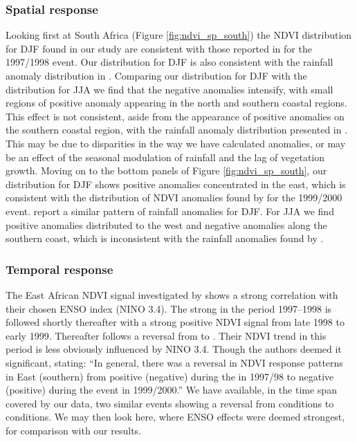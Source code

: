 \subsubsection{Spatial response}
Looking first at South Africa (Figure \ref{fig:ndvi_sp_south}) the
NDVI distribution for DJF \elnino{} found in our study are consistent
with those reported in \cite{anyamba2002} for the 1997/1998 \elnino{}
event. Our distribution for DJF \elnino{} is also consistent with the
rainfall anomaly distribution in \cite{deoliveira2018}. Comparing our
distribution for DJF \elnino{} with the distribution for JJA \elnino{}
we find that the negative anomalies intensify, with small regions of
positive anomaly appearing in the north and southern coastal
regions. This effect is not consistent, aside from the appearance of
positive anomalies on the southern coastal region, with the rainfall
anomaly distribution presented in \cite{deoliveira2018}. This may be
due to disparities in the way we have calculated anomalies, or may be
an effect of the seasonal modulation of rainfall and the lag of
vegetation growth. Moving on to the bottom panels of Figure
\ref{fig:ndvi_sp_south}, our distribution for DJF \nina{} shows
positive anomalies concentrated in the east, which is consistent with
the distribution of NDVI anomalies found by \cite{anyamba2002} for the
1999/2000 \nina{} event. \cite{deoliveira2018} report a similar
pattern of rainfall anomalies for DJF. For JJA we find positive
anomalies distributed to the west and negative anomalies along the
southern coast, which is inconsistent with the rainfall anomalies
found by \cite{deoliveira2018}.

\subsubsection{Temporal response}

The East African NDVI signal investigated by \cite{anyamba2002} shows a strong
correlation with their chosen ENSO index (NINO 3.4). The strong \elnino{} in the
period 1997--1998 is followed shortly thereafter with a strong positive NDVI
signal from late 1998 to early 1999. Thereafter follows a reversal from
\elnino{} to \nina{}. Their NDVI trend in this period is less obviously
influenced by NINO 3.4. Though the authors deemed it significant, stating: ``In
general, there was a reversal in NDVI response patterns in East (southern) from
positive (negative) during the \elnino{} in 1997/98 to negative (positive)
during the \nina{} event in 1999/2000.'' We have available, in the time span
covered by our data, two similar events showing a reversal from \elnino{}
conditions to \nina{} conditions. We may then look here, where ENSO effects were
deemed strongest, for comparison with our results.

